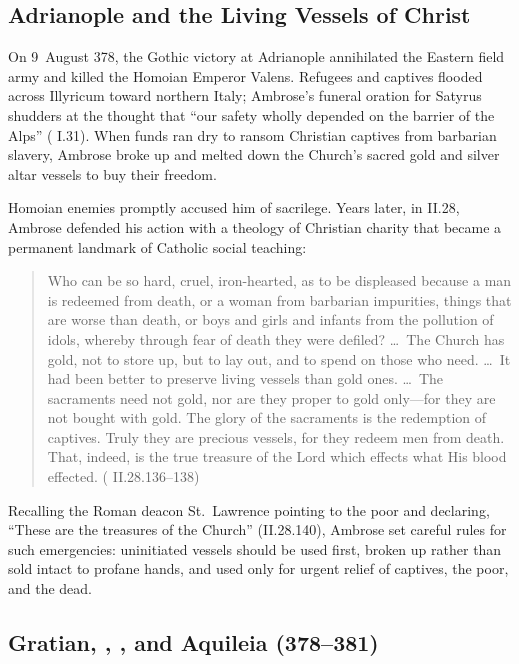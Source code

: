 \subsection{Adrianople and the Living Vessels of Christ}

On 9~August 378, the Gothic victory at Adrianople annihilated the Eastern field army and killed the Homoian Emperor Valens. Refugees and captives flooded across Illyricum toward northern Italy; Ambrose's funeral oration for Satyrus shudders at the thought that ``our safety wholly depended on the barrier of the Alps'' ( I.31). When funds ran dry to ransom Christian captives from barbarian slavery, Ambrose broke up and melted down the Church's sacred gold and silver altar vessels to buy their freedom.

Homoian enemies promptly accused him of sacrilege. Years later, in  II.28, Ambrose defended his action with a theology of Christian charity that became a permanent landmark of Catholic social teaching:

\begin{quote}
Who can be so hard, cruel, iron-hearted, as to be displeased because a man is redeemed from death, or a woman from barbarian impurities, things that are worse than death, or boys and girls and infants from the pollution of idols, whereby through fear of death they were defiled? \ldots\ The Church has gold, not to store up, but to lay out, and to spend on those who need. \ldots\ It had been better to preserve living vessels than gold ones. \ldots\ The sacraments need not gold, nor are they proper to gold only---for they are not bought with gold. The glory of the sacraments is the redemption of captives. Truly they are precious vessels, for they redeem men from death. That, indeed, is the true treasure of the Lord which effects what His blood effected. ( II.28.136--138)
\end{quote}

Recalling the Roman deacon St.~Lawrence pointing to the poor and declaring, ``These are the treasures of the Church'' (II.28.140), Ambrose set careful rules for such emergencies: uninitiated vessels should be used first, broken up rather than sold intact to profane hands, and used only for urgent relief of captives, the poor, and the dead.

\subsection{Gratian, , , and Aquileia (378--381)}

